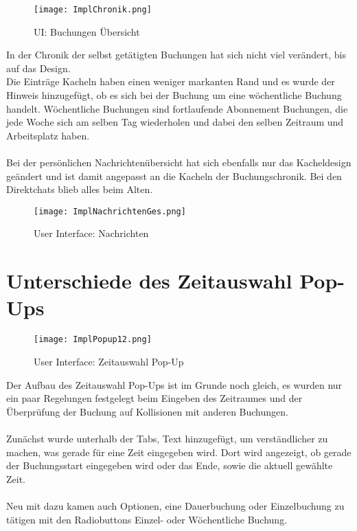 \newpage

\begin{wrapfigure}[14]{r}{5.5cm}
  \texttt{[image: ImplChronik.png]}
  \caption{UI: Buchungen Übersicht}
\end{wrapfigure}

In der Chronik der selbst getätigten Buchungen hat sich nicht viel verändert, bis auf das Design.
\\
Die Einträge Kacheln haben einen weniger markanten Rand und es wurde der Hinweis hinzugefügt, ob es sich bei der Buchung um eine wöchentliche Buchung handelt.
Wöchentliche Buchungen sind fortlaufende Abonnement Buchungen, die jede Woche sich am selben Tag wiederholen und dabei den selben Zeitraum und Arbeitsplatz haben.
\paragraph{}
Bei der persönlichen Nachrichtenübersicht hat sich ebenfalls nur das Kacheldesign geändert und ist damit angepasst an die Kacheln der Buchungschronik.
Bei den Direktchats blieb alles beim Alten.
\vspace{29mm}
\begin{figure}[!h]
  \centering
  \texttt{[image: ImplNachrichtenGes.png]}
  \caption{User Interface: Nachrichten}
  \label{fig:UI_Messages}
\end{figure}

\newpage

\section{Unterschiede des Zeitauswahl Pop-Ups}

\begin{figure}[!h]
  \centering
  \texttt{[image: ImplPopup12.png]}
  \caption{User Interface: Zeitauswahl Pop-Up}
  \label{fig:UI_timePopUp}
\end{figure}

Der Aufbau des Zeitauswahl Pop-Ups ist im Grunde noch gleich, es wurden nur ein paar Regelungen festgelegt beim Eingeben des Zeitraumes und der Überprüfung der Buchung auf Kollisionen mit anderen Buchungen.
\paragraph{}
Zunächst wurde unterhalb der Tabs, Text hinzugefügt, um verständlicher zu machen, was gerade für eine Zeit eingegeben wird.
Dort wird angezeigt, ob gerade der Buchungsstart eingegeben wird oder das Ende, sowie die aktuell gewählte Zeit.
\\\\
Neu mit dazu kamen auch Optionen, eine Dauerbuchung oder Einzelbuchung zu tätigen mit den Radiobuttons Einzel- oder Wöchentliche Buchung.
